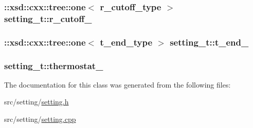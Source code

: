 \subsubsection[{\texorpdfstring{r\+\_\+cutoff\+\_\+}{r_cutoff_}}]{\setlength{\rightskip}{0pt plus 5cm}\+::xsd\+::cxx\+::tree\+::one$<$ {\bf r\+\_\+cutoff\+\_\+type} $>$ setting\+\_\+t\+::r\+\_\+cutoff\+\_\+\hspace{0.3cm}{\ttfamily [protected]}}\hypertarget{classsetting__t_abb5886ffed579461471d95037fc06d78}{}\label{classsetting__t_abb5886ffed579461471d95037fc06d78}
\subsubsection[{\texorpdfstring{t\+\_\+end\+\_\+}{t_end_}}]{\setlength{\rightskip}{0pt plus 5cm}\+::xsd\+::cxx\+::tree\+::one$<$ {\bf t\+\_\+end\+\_\+type} $>$ setting\+\_\+t\+::t\+\_\+end\+\_\+\hspace{0.3cm}{\ttfamily [protected]}}\hypertarget{classsetting__t_ac8bc0677b3f39c6549ab0d632acbad70}{}\label{classsetting__t_ac8bc0677b3f39c6549ab0d632acbad70}
\subsubsection[{\texorpdfstring{thermostat\+\_\+}{thermostat_}}]{ setting\+\_\+t\+::thermostat\+\_\+\hspace{0.3cm}{\ttfamily [protected]}}\hypertarget{classsetting__t_a77d5939fe7b2975b46345542df12911d}{}\label{classsetting__t_a77d5939fe7b2975b46345542df12911d}


The documentation for this class was generated from the following files\+:\begin{DoxyCompactItemize}
\item 
src/setting/\hyperlink{setting_8h}{setting.\+h}\item 
src/setting/\hyperlink{setting_8cpp}{setting.\+cpp}\end{DoxyCompactItemize}
